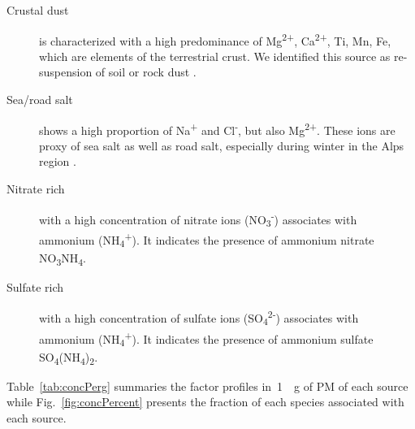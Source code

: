 \documentclass[]{article}
\begin{document}
\begin{description}
    \item[Crustal dust] is characterized with a high predominance of
        Mg\textsuperscript{2+}, Ca\textsuperscript{2+}, Ti, Mn, Fe, which are
        elements of the terrestrial crust. We identified this source as
        re-suspension of soil or rock dust
        \citep{almeida_source_2005,dallosto_hourly_2013,moreno_variations_2011,putaud_size-segregated_2004}.

    \item[Sea/road salt] shows a high proportion of Na\textsuperscript{+}
        and Cl\textsuperscript{-}, but also Mg\textsuperscript{2+}. These ions
        are proxy of sea salt
        \citep{belis_critical_2013,odowd_marine_1997,pio_climatology_2007} as well as road salt, especially during winter in the Alps
        region \citep{air_rhone-alpes_influence_2012}.

    \item[Nitrate rich] with a high concentration of nitrate ions
        (NO\textsubscript{3}\textsuperscript{-}) associates with ammonium
        (NH\textsubscript{4}\textsuperscript{+}). It indicates the presence of
        ammonium nitrate NO\textsubscript{3}NH\textsubscript{4}.

    \item[Sulfate rich] with a high concentration of sulfate ions
        (SO\textsubscript{4}\textsuperscript{2-}) associates with ammonium
        (NH\textsubscript{4}\textsuperscript{+}). It indicates the presence of
        ammonium sulfate
        SO\textsubscript{4}(NH\textsubscript{4})\textsubscript{2}.

\end{description}

Table~\ref{tab:concPerg} summaries the factor profiles in~\SI{1}{{\mu}g} of PM
of each source while Fig.~\ref{fig:concPercent} presents the fraction of each
species associated with each source.
\end{document}
